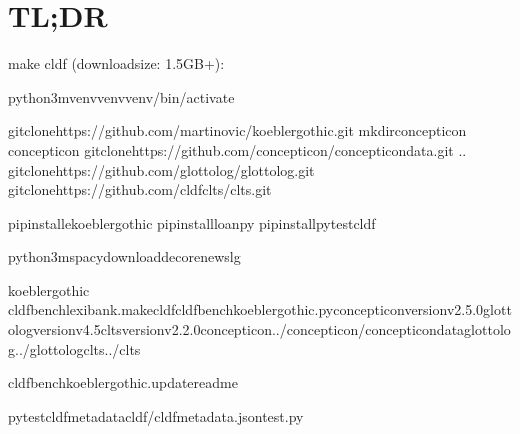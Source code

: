 \documentclass[letterpaper,10pt,english]{sphinxmanual}
\begin{document}
{{{{\begin{itemize}
\end{itemize}

\sphinxstepscope


\chapter{TL;DR}
\label{\detokenize{TL;DR:id1}}\label{\detokenize{TL;DR::doc}}\label{\detokenize{TL;DR:module-koeblergothiccommands.__init__}}
\sphinxAtStartPar
make cldf (downloadsize: 1.5GB+):

\begin{sphinxVerbatim}[commandchars=\\\{\}]
python3\PYGZhy{}mvenvvenvvenv/bin/activate

gitclonehttps://github.com/martino\PYGZhy{}vic/koeblergothic.git
mkdirconcepticon
concepticon
gitclonehttps://github.com/concepticon/concepticon\PYGZhy{}data.git
..
gitclonehttps://github.com/glottolog/glottolog.git
gitclonehttps://github.com/cldf\PYGZhy{}clts/clts.git

pipinstall\PYGZhy{}ekoeblergothic
pipinstallloanpy
pipinstallpytest\PYGZhy{}cldf

python3\PYGZhy{}mspacydownloadde\PYGZus{}core\PYGZus{}news\PYGZus{}lg

koeblergothic
cldfbenchlexibank.makecldfcldfbench\PYGZus{}koeblergothic.py\PYGZhy{}\PYGZhy{}concepticon\PYGZhy{}versionv2.5.0\PYGZhy{}\PYGZhy{}glottolog\PYGZhy{}versionv4.5\PYGZhy{}\PYGZhy{}clts\PYGZhy{}versionv2.2.0\PYGZhy{}\PYGZhy{}concepticon../concepticon/concepticon\PYGZhy{}data\PYGZhy{}\PYGZhy{}glottolog../glottolog\PYGZhy{}\PYGZhy{}clts../clts

cldfbenchkoeblergothic.update\PYGZus{}readme

pytest\PYGZhy{}\PYGZhy{}cldf\PYGZhy{}metadatacldf/cldf\PYGZhy{}metadata.jsontest.py
\end{sphinxVerbatim}

}}}}
\end{document}
